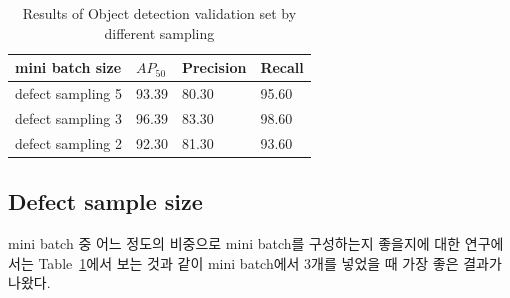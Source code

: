 \documentclass[10pt,twocolumn,letterpaper]{article}
\begin{document}
\begin{table}[ht]  
\begin{center}
\begin{tabular}{|l|l|l|l|}
\toprule
mini batch size      & ${AP}_{50}$ & Precision & Recall \\ \midrule
defect sampling 5    & 93.39 & 80.30     & 95.60   \\
defect sampling 3    & 96.39 & 83.30     & 98.60   \\
defect sampling 2    & 92.30 & 81.30     & 93.60   \\  \bottomrule
\end{tabular}
\caption{Results of Object detection validation set by different sampling}\label{exp:minibatch}
\end{center}
\end{table}
\subsection{Defect sample size}
mini batch 중 어느 정도의 비중으로 mini batch를 구성하는지 좋을지에 대한 연구에서는 
Table~\ref{exp:minibatch}에서 보는 것과 같이 mini batch에서 3개를 넣었을 때 가장 좋은 결과가 나왔다.
\end{document}
